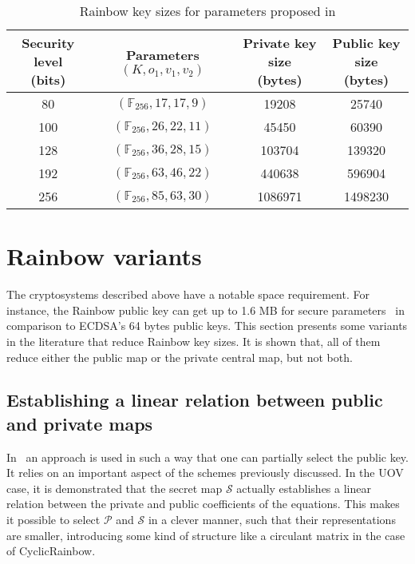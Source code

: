 \documentclass{ufsctex/ufsctex}
\begin{document}
\begin{table}
\begin{center}
\begin{tabular}{|c|c|c|c|}
\hline
\thead{Security level\\(bits)} & \thead{Parameters\\$(K, o_1, v_1, v_2)$}
& \thead{Private key size\\(bytes)} & \thead{Public key size\\(bytes)} \\
\hline
80  & $(\mathbb{F}_{256}, 17, 17, 9)$   & 19208   & 25740   \\ \hline
100 & $(\mathbb{F}_{256}, 26, 22, 11)$  & 45450   & 60390   \\ \hline
128 & $(\mathbb{F}_{256}, 36, 28, 15)$  & 103704  & 139320  \\ \hline
192 & $(\mathbb{F}_{256}, 63, 46, 22)$  & 440638  & 596904  \\ \hline
256 & $(\mathbb{F}_{256}, 85, 63, 30)$  & 1086971 & 1498230 \\ \hline
\end{tabular}
\caption{Rainbow key sizes for parameters proposed in \cite{petzoldt2013thesis}}
\label{tab:rainbowkeysizes}
\end{center}
\end{table}

\section{Rainbow variants}\label{sec:rainbowvariants}

The cryptosystems described above have a notable space requirement. For
instance, the Rainbow public key can get up to 1.6 MB for secure
parameters~\cite[Table 2]{ding2017nist} in comparison to ECDSA's 64 bytes
public keys. This section presents some variants in the literature that reduce
Rainbow key sizes. It is shown that, all of them reduce either the public map
or the private central map, but not both.

\subsection{Establishing a linear relation between public and private maps}
\label{sec:relation}

In~\cite{petzoldt2010cyclicrainbow} an approach is used in such a way that one
can partially select the public key. It relies on an important aspect of the
schemes previously discussed. In the UOV case, it is demonstrated that the
secret map $\mathcal{S}$ actually establishes a linear relation between the
private and public coefficients of the equations. This makes it possible to
select $\mathcal{P}$ and $\mathcal{S}$ in a clever manner, such that their
representations are smaller, introducing some kind of structure like a
circulant matrix in the case of CyclicRainbow.
\end{document}
